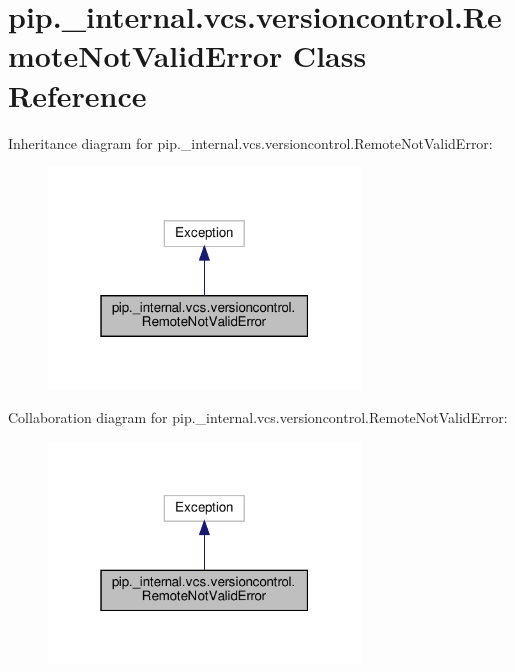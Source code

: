 \hypertarget{classpip_1_1__internal_1_1vcs_1_1versioncontrol_1_1RemoteNotValidError}{}\section{pip.\+\_\+internal.\+vcs.\+versioncontrol.\+Remote\+Not\+Valid\+Error Class Reference}
\label{classpip_1_1__internal_1_1vcs_1_1versioncontrol_1_1RemoteNotValidError}


Inheritance diagram for pip.\+\_\+internal.\+vcs.\+versioncontrol.\+Remote\+Not\+Valid\+Error\+:
\nopagebreak
\begin{figure}[H]
\begin{center}
\leavevmode
\includegraphics[width=235pt]{classpip_1_1__internal_1_1vcs_1_1versioncontrol_1_1RemoteNotValidError__inherit__graph}
\end{center}
\end{figure}


Collaboration diagram for pip.\+\_\+internal.\+vcs.\+versioncontrol.\+Remote\+Not\+Valid\+Error\+:
\nopagebreak
\begin{figure}[H]
\begin{center}
\leavevmode
\includegraphics[width=235pt]{classpip_1_1__internal_1_1vcs_1_1versioncontrol_1_1RemoteNotValidError__coll__graph}
\end{center}
\end{figure}
